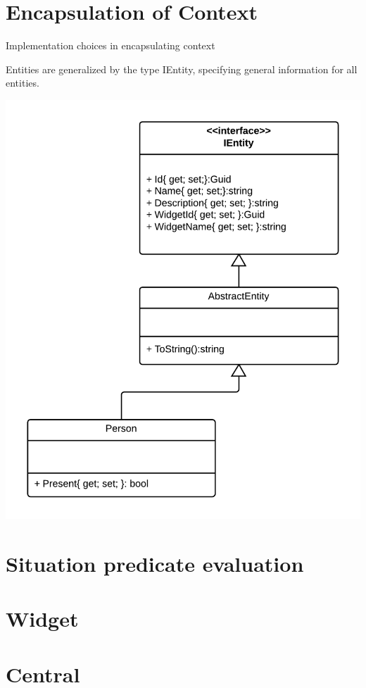\documentclass[]{report}
\begin{document}
\section{Encapsulation of Context}
Implementation choices in encapsulating context

Entities are generalized by the type IEntity, specifying general information for all entities.


\begin{center}
\includegraphics[scale=0.15]{ContextClassDiagram.png}
\end{center}

\section{Situation predicate evaluation}

\section{Widget}

\section{Central}
\end{document}
